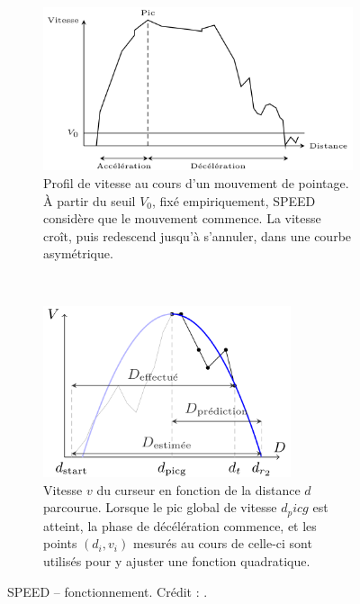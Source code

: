 	\begin{figure}[hbp]
		\begin{subfigure}[t]{0.48\textwidth}
			\centering
			\includegraphics[width=\textwidth]{figures/ch2/speedProfile}
			\caption{Profil de vitesse au cours d'un mouvement de pointage. À partir du seuil $V_{0}$, fixé empiriquement, SPEED considère que le mouvement commence. La vitesse croît, puis redescend jusqu'à s'annuler, dans une courbe asymétrique.}
			\label{fig:speedProfile}
		\end{subfigure}
		~
		\begin{subfigure}[t]{0.50\textwidth}
			\centering
			\includegraphics[width=0.8\textwidth]{figures/ch2/speedExplained}
			\caption{Vitesse $v$ du curseur en fonction de la distance $d$ parcourue. Lorsque le pic global de vitesse $d_picg$ est atteint, la phase de décélération commence, et les points $(d_{i}, v_{i})$ mesurés au cours de celle-ci sont utilisés pour y ajuster une fonction quadratique.}
			\label{fig:speedExplained}
		\end{subfigure}
		\caption[SPEED -- fonctionnement]{SPEED -- fonctionnement. Crédit : \cite{wonner2011speed}.}
		\label{fig:speedCursor}
	\end{figure}
	
